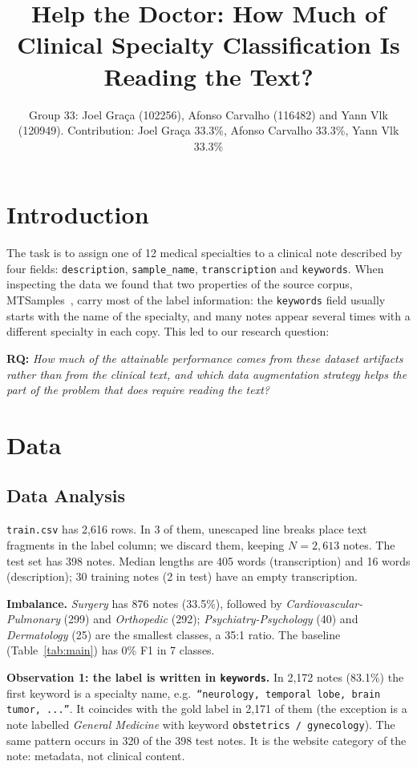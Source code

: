 \documentclass[twocolumn,10pt]{article}
\title{Help the Doctor: How Much of Clinical Specialty Classification Is Reading the Text?}
\author{Group 33: Joel Graça (102256), Afonso Carvalho (116482) and Yann Vlk (120949). Contribution: Joel Graça 33.3\%, Afonso Carvalho 33.3\%, Yann Vlk 33.3\%}
\affil{Instituto Superior Técnico, Universidade de Lisboa}
\date{}
\newcommand{\spec}[1]{\textit{#1}}
\begin{document}
\maketitle

\section{Introduction}

The task is to assign one of 12 medical specialties to a clinical note described by four fields: \texttt{description}, \texttt{sample\_name}, \texttt{transcription} and \texttt{keywords}. When inspecting the data we found that two properties of the source corpus, MTSamples~\cite{mtsamples}, carry most of the label information: the \texttt{keywords} field usually starts with the name of the specialty, and many notes appear several times with a different specialty in each copy. This led to our research question:

\textbf{RQ:} \emph{How much of the attainable performance comes from these dataset artifacts rather than from the clinical text, and which data augmentation strategy helps the part of the problem that does require reading the text?}

\section{Data}

\subsection{Data Analysis}

\texttt{train.csv} has 2,616 rows. In 3 of them, unescaped line breaks place text fragments in the label column; we discard them, keeping $N=2{,}613$ notes. The test set has 398 notes. Median lengths are 405 words (transcription) and 16 words (description); 30 training notes (2 in test) have an empty transcription.

\textbf{Imbalance.} \spec{Surgery} has 876 notes (33.5\%), followed by \spec{Cardiovascular-Pulmonary} (299) and \spec{Orthopedic} (292); \spec{Psychiatry-Psychology} (40) and \spec{Dermatology} (25) are the smallest classes, a 35:1 ratio. The baseline (Table~\ref{tab:main}) has 0\% F1 in 7 classes.

\textbf{Observation 1: the label is written in \texttt{keywords}.} In 2,172 notes (83.1\%) the first keyword is a specialty name, e.g.\ \texttt{``neurology, temporal lobe, brain tumor, ...''}. It coincides with the gold label in 2,171 of them (the exception is a note labelled \spec{General Medicine} with keyword \texttt{obstetrics / gynecology}). The same pattern occurs in 320 of the 398 test notes. It is the website category of the note: metadata, not clinical content.
\end{document}
